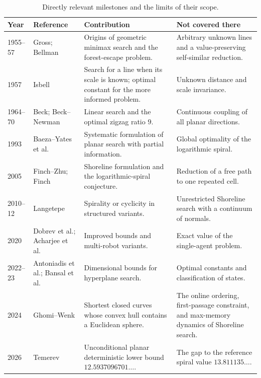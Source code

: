 \documentclass[10pt,a4paper]{article}
\theoremstyle{definition}
\theoremstyle{remark}
\begin{document}
\begin{table}[ht]
\centering
\small
\caption{Directly relevant milestones and the limits of their scope.}
\label{tab:history}
\begin{tabularx}{\textwidth}{@{}p{1.5cm}p{2.6cm}X X@{}}
\toprule
Year & Reference & Contribution & Not covered there \\
\midrule
1955--57 & Gross; Bellman \cite{Gross,BellmanMin,BellmanDP} & Origins of geometric minimax search and the forest-escape problem. & Arbitrary unknown lines and a value-preserving self-similar reduction. \\
1957 & Isbell \cite{Isbell} & Search for a line when its scale is known; optimal constant for the more informed problem. & Unknown distance and scale invariance. \\
1964--70 & Beck; Beck--Newman \cite{Beck,BeckNewman} & Linear search and the optimal zigzag ratio $9$. & Continuous coupling of all planar directions. \\
1993 & Baeza--Yates et al. \cite{BaezaYates} & Systematic formulation of planar search with partial information. & Global optimality of the logarithmic spiral. \\
2005 & Finch--Zhu; Finch \cite{FinchZhu,FinchSpiral} & Shoreline formulation and the logarithmic-spiral conjecture. & Reduction of a free path to one repeated cell. \\
2010--12 & Langetepe \cite{LangetepeSODA,LangetepeAxis} & Spirality or cyclicity in structured variants. & Unrestricted Shoreline search with a continuum of normals. \\
2020 & Dobrev et al.; Acharjee et al. \cite{Dobrev,Acharjee} & Improved bounds and multi-robot variants. & Exact value of the single-agent problem. \\
2022--23 & Antoniadis et al.; Bansal et al. \cite{Antoniadis,Bansal} & Dimensional bounds for hyperplane search. & Optimal constants and classification of states. \\
2024 & Ghomi--Wenk \cite{GhomiWenk} & Shortest closed curves whose convex hull contains a Euclidean sphere. & The online ordering, first-passage constraint, and max-memory dynamics of Shoreline search. \\
2026 & Temerev \cite{Temerev} & Unconditional planar deterministic lower bound $12.5937096701\ldots$. & The gap to the reference spiral value $13.811135\ldots$. \\
\bottomrule
\end{tabularx}
\end{table}
\end{document}
